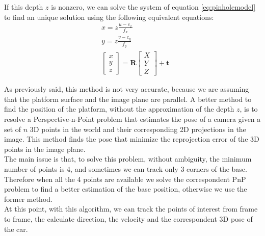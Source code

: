 If this depth $z$ is nonzero, we can  solve the system of equation \eqref{eq:pinholemodel} to find an unique solution using the following equivalent equations:
\begin{subequations}
\begin{align}
&x = z\frac{u-c_x}{f_x}\\[10pt]
&y = z\frac{v-c_y}{f_y}\\[10pt]
&{\begin{bmatrix}
x \\[10pt]
y \\[10pt]
z
\end{bmatrix}} = 
\boldsymbol{R} {\begin{bmatrix}
X \\[10pt]
Y \\[10pt]
Z
\end{bmatrix}} + \boldsymbol{t}
\end{align}
\end{subequations}

As previously said, this method is not very accurate, because we are assuming that the platform surface and the image plane are parallel.
A better method to find the position of the platform, without the approximation of the depth $z$, is to resolve a Perspective-n-Point problem  \cite{quan1999linear} that estimates the pose of a camera given a set of $n$ 3D points in the world and their corresponding 2D projections in the image. This method finds the pose that minimize the reprojection error of the 3D points in the image plane.\\
The main issue is that, to solve this problem, without ambiguity, the minimum number of points is 4, and sometimes we can track only 3 corners of the base. Therefore when all the 4 points are available we solve the correspondent PnP problem to find a better estimation of the base position, otherwise we use the former method.\\

At this point, with this algorithm, we can track the points of interest from frame to frame, the calculate direction, the velocity and the correspondent 3D pose of the car.\\

